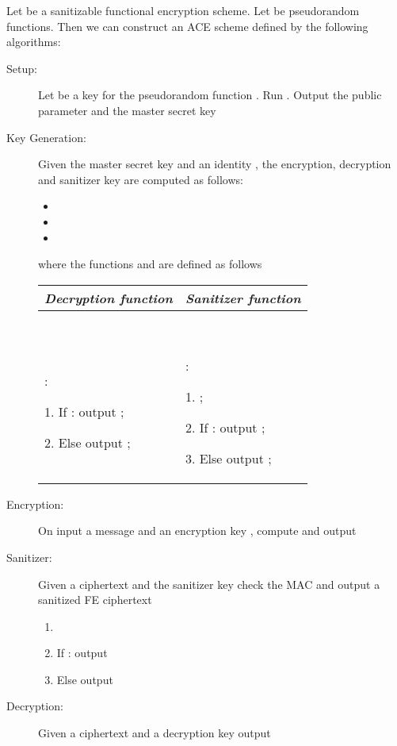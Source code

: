 \documentclass{llncs}
\begin{document}
\begin{construction} \label{con:ACEfromFE}
Let  be a sanitizable functional encryption scheme. Let  be pseudorandom functions.
Then we can construct an ACE scheme  defined by the following algorithms:
\end{construction}
\begin{description}
\item[Setup:]
Let  be a key for the pseudorandom function . Run . 
Output the public parameter  and the master secret key 


\item[Key Generation:]
Given the master secret key  and an identity , the encryption, decryption and sanitizer key are computed as follows:
\begin{itemize}
\item 
\item 
\item 
\end{itemize}
where the functions  and  are defined as follows

\begin{center}
\begin{small}
    \begin{tabular}{| p{5.5cm} | p{5cm} |}
\hline
	\multicolumn{1}{|c|}{\textbf{\emph{Decryption function}}} & \multicolumn{1}{|c|}{\textbf{\emph{Sanitizer function}}}  \\
	\hline
	\
	
	:

	1. If : output ;

	2. Else output ;

	&
	\

	: 
	
	1. ;
	
	2. If : output ;
	
	3. Else output ;

	\\
	\hline
	\end{tabular}
\end{small}
\end{center}


\item[Encryption:]
On input a message  and an encryption key , compute  and output 


\item[Sanitizer:]
Given a ciphertext  and the sanitizer key  check the MAC and output a sanitized FE ciphertext
\begin{enumerate}
\item 
\item If : output 
\item Else output  
\end{enumerate}


\item[Decryption:] 
Given a ciphertext  and a decryption key  output 
\end{description}
\end{document}
